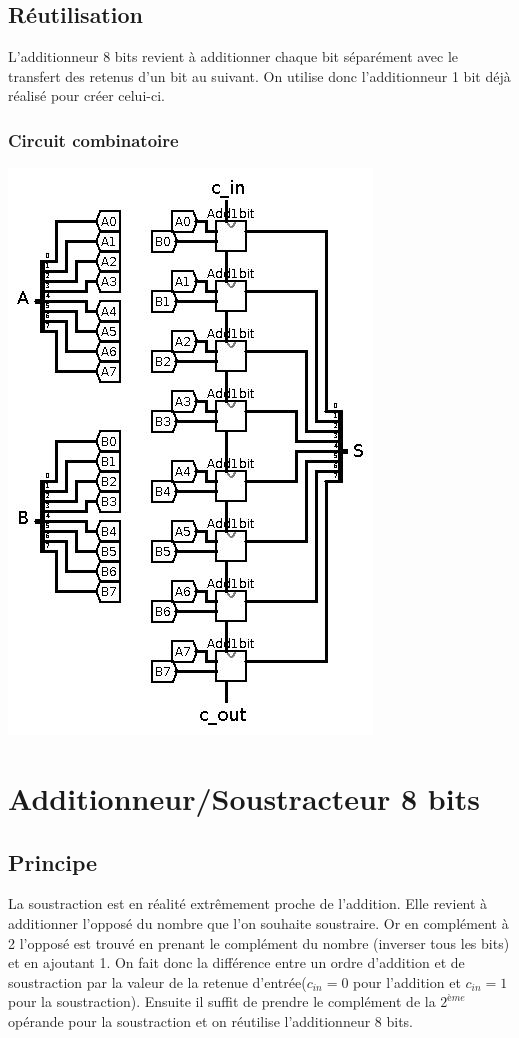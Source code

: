 \documentclass[10pt,a4paper]{article}
\begin{document}
\subsection{Réutilisation}
L'additionneur 8 bits revient à additionner chaque bit séparément avec le transfert des retenus d'un bit au suivant. On utilise donc l'additionneur 1 bit déjà réalisé pour créer celui-ci.

\subsubsection{Circuit combinatoire}
\includegraphics[scale=0.5]{Add8bit.jpg} 

\section{Additionneur/Soustracteur 8 bits}
\subsection{Principe}
La soustraction est en réalité extrêmement proche de l'addition. Elle revient à additionner l'opposé du nombre que l'on souhaite soustraire. Or en complément à 2 l'opposé est trouvé en prenant le complément du nombre (inverser tous les bits) et en ajoutant 1. On fait donc la différence entre un ordre d'addition et de soustraction par la valeur de la retenue d'entrée($c_{in}=0$ pour l'addition et $c_{in}=1$ pour la soustraction). Ensuite il suffit de prendre le complément de la $2^{ème}$ opérande pour la soustraction et on réutilise l'additionneur 8 bits.
\end{document}
